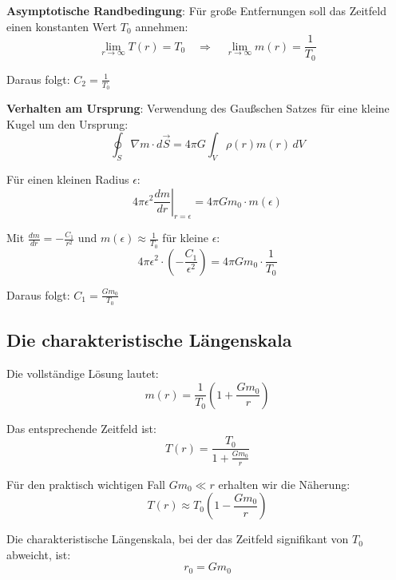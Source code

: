 	\textbf{Asymptotische Randbedingung}: Für große Entfernungen soll das Zeitfeld einen konstanten Wert $T_0$ annehmen:
	\begin{equation}
		\lim_{r \to \infty} T(r) = T_0 \quad \Rightarrow \quad \lim_{r \to \infty} m(r) = \frac{1}{T_0}
	\end{equation}
	
	Daraus folgt: $C_2 = \frac{1}{T_0}$
	
	\textbf{Verhalten am Ursprung}: Verwendung des Gaußschen Satzes \citep{griffiths1999,jackson1998} für eine kleine Kugel um den Ursprung:
	\begin{equation}
		\oint_S \nabla m \cdot d\vec{S} = 4\pi G \int_V \rho(r) m(r) \, dV
	\end{equation}
	
	Für einen kleinen Radius $\epsilon$:
	\begin{equation}
		4\pi \epsilon^2 \left.\frac{dm}{dr}\right|_{r=\epsilon} = 4\pi G m_0 \cdot m(\epsilon)
	\end{equation}
	
	Mit $\frac{dm}{dr} = -\frac{C_1}{r^2}$ und $m(\epsilon) \approx \frac{1}{T_0}$ für kleine $\epsilon$:
	\begin{equation}
		4\pi \epsilon^2 \cdot \left(-\frac{C_1}{\epsilon^2}\right) = 4\pi G m_0 \cdot \frac{1}{T_0}
	\end{equation}
	
	Daraus folgt: $C_1 = \frac{G m_0}{T_0}$
	
	\subsection{Die charakteristische Längenskala}
	\label{subsec:characteristic_length}
	
	Die vollständige Lösung lautet:
	\begin{equation}
		m(r) = \frac{1}{T_0}\left(1 + \frac{G m_0}{r}\right)
	\end{equation}
	
	Das entsprechende Zeitfeld ist:
	\begin{equation}
		T(r) = \frac{T_0}{1 + \frac{G m_0}{r}}
	\end{equation}
	
	Für den praktisch wichtigen Fall $G m_0 \ll r$ erhalten wir die Näherung:
	\begin{equation}
		T(r) \approx T_0\left(1 - \frac{G m_0}{r}\right)
	\end{equation}
	
	Die charakteristische Längenskala, bei der das Zeitfeld signifikant von $T_0$ abweicht, ist:
	\begin{equation}
		\boxed{r_0 = G m_0}
	\end{equation}
	

